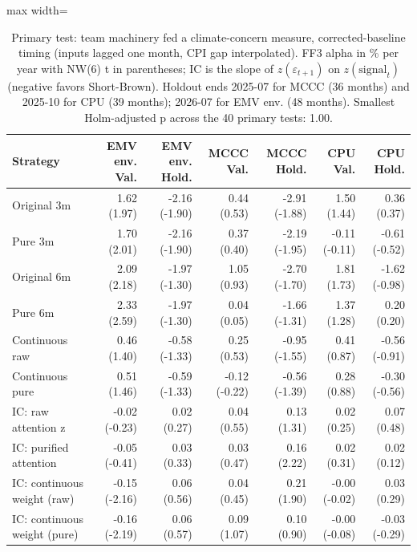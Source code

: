 \begin{table}[H]
\centering\footnotesize
\caption{Primary test: team machinery fed a climate-concern measure, corrected-baseline timing (inputs lagged one month, CPI gap interpolated). FF3 alpha in \% per year with NW(6) t in parentheses; IC is the slope of $z(\varepsilon_{t+1})$ on $z(\text{signal}_t)$ (negative favors Short-Brown). Holdout ends 2025-07 for MCCC (36 months) and 2025-10 for CPU (39 months); 2026-07 for EMV env. (48 months). Smallest Holm-adjusted p across the 40 primary tests: 1.00.}
\label{tab:m1b_primary}
\begin{adjustbox}{max width=\linewidth}
\begin{tabular}{lrrrrrr}
\toprule
Strategy & EMV env. Val. & EMV env. Hold. & MCCC Val. & MCCC Hold. & CPU Val. & CPU Hold. \\
\midrule
Original 3m & 1.62 (1.97) & -2.16 (-1.90) & 0.44 (0.53) & -2.91 (-1.88) & 1.50 (1.44) & 0.36 (0.37) \\
Pure 3m & 1.70 (2.01) & -2.16 (-1.90) & 0.37 (0.40) & -2.19 (-1.95) & -0.11 (-0.11) & -0.61 (-0.52) \\
Original 6m & 2.09 (2.18) & -1.97 (-1.30) & 1.05 (0.93) & -2.70 (-1.70) & 1.81 (1.73) & -1.62 (-0.98) \\
Pure 6m & 2.33 (2.59) & -1.97 (-1.30) & 0.04 (0.05) & -1.66 (-1.31) & 1.37 (1.28) & 0.20 (0.20) \\
Continuous raw & 0.46 (1.40) & -0.58 (-1.33) & 0.25 (0.53) & -0.95 (-1.55) & 0.41 (0.87) & -0.56 (-0.91) \\
Continuous pure & 0.51 (1.46) & -0.59 (-1.33) & -0.12 (-0.22) & -0.56 (-1.39) & 0.28 (0.88) & -0.30 (-0.56) \\
IC: raw attention z & -0.02 (-0.23) & 0.02 (0.27) & 0.04 (0.55) & 0.13 (1.31) & 0.02 (0.25) & 0.07 (0.48) \\
IC: purified attention & -0.05 (-0.41) & 0.03 (0.33) & 0.03 (0.47) & 0.16 (2.22) & 0.02 (0.31) & 0.02 (0.12) \\
IC: continuous weight (raw) & -0.15 (-2.16) & 0.06 (0.56) & 0.04 (0.45) & 0.21 (1.90) & -0.00 (-0.02) & 0.03 (0.29) \\
IC: continuous weight (pure) & -0.16 (-2.19) & 0.06 (0.57) & 0.09 (1.07) & 0.10 (0.90) & -0.00 (-0.08) & -0.03 (-0.29) \\
\bottomrule
\end{tabular}
\end{adjustbox}
\end{table}
